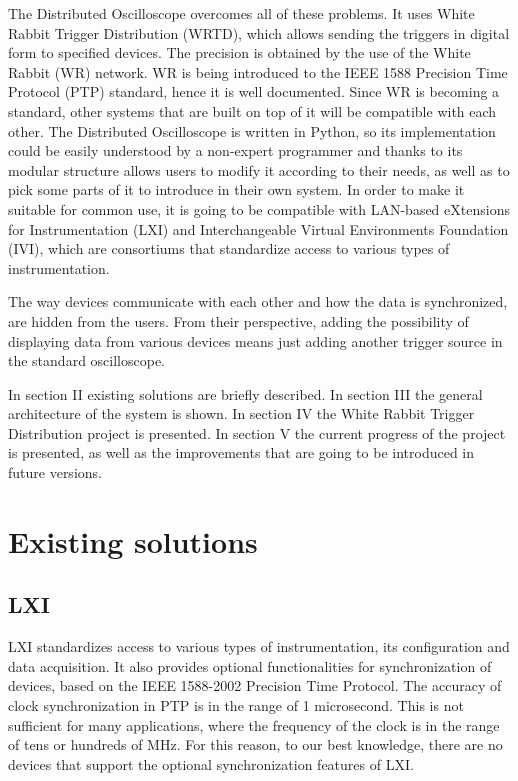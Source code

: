 \documentclass[conference]{IEEEtran}
\begin{document}
The Distributed Oscilloscope overcomes all of these problems. It uses White Rabbit Trigger Distribution (WRTD), which allows sending the triggers in digital form to specified devices. The precision is obtained by the use of the White Rabbit (WR) network. WR is being introduced to the IEEE 1588 Precision Time Protocol (PTP) standard, hence it is well documented. Since WR is becoming a standard, other systems that are built on top of it will be compatible with each other. The Distributed Oscilloscope is written in Python, so its implementation could be easily understood by a non-expert programmer and thanks to its modular structure allows users to modify it according to their needs, as well as to pick some parts of it to introduce in their own system. In order to make it suitable for common use, it is going to be compatible with LAN-based eXtensions for Instrumentation (LXI) and Interchangeable Virtual Environments Foundation (IVI), which are consortiums that standardize access to various types of instrumentation. 

The way devices communicate with each other and how the data is synchronized, are hidden from the users. From their perspective, adding the possibility of displaying data from various devices means just adding another trigger source in the standard oscilloscope.

In section II existing solutions are briefly described.
In section III the general architecture of the system is shown.  
In section IV the White Rabbit Trigger Distribution project is presented.
In section V the current progress of the project is presented, as well as the improvements that are going to be introduced in future versions.

\section{Existing solutions}

\subsection{LXI}
LXI standardizes access to various types of instrumentation, its configuration and data acquisition. It also provides optional functionalities for synchronization of devices, based on the IEEE 1588-2002 Precision Time Protocol. The accuracy of clock synchronization in PTP is in the range of 1 microsecond. This is not sufficient for many applications, where the frequency of the clock is in the range of tens or hundreds of MHz. For this reason, to our best knowledge, there are no devices that support the optional synchronization features of LXI.
\end{document}
